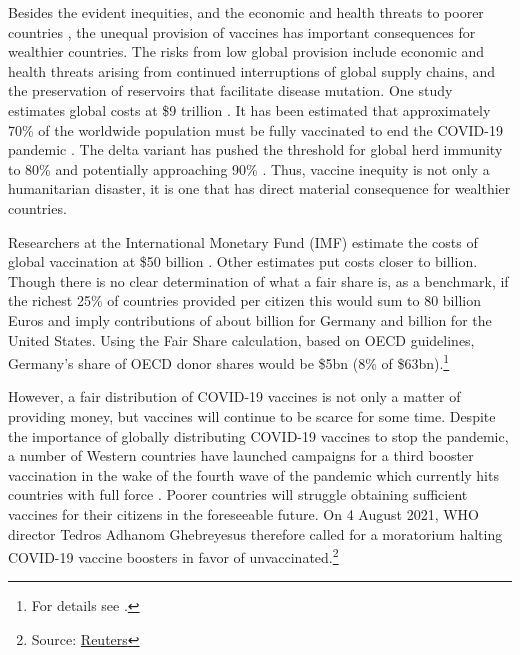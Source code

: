 \documentclass[]{article}
\begin{document}
Besides the evident inequities, and the economic and health threats to poorer countries \citep{egger2021falling}, the unequal provision of vaccines has important consequences for wealthier countries. The risks from low global provision include economic and health threats  arising from continued interruptions of global supply chains, and the preservation of reservoirs that facilitate disease mutation. One study estimates global costs at \$9 trillion \citet{agarwal2021proposal}. It has been estimated that  approximately 70\% of the worldwide population must be fully vaccinated to end the COVID-19 pandemic \citep{Randolph2020}. The delta variant has pushed the threshold for global herd immunity to  80\% and potentially approaching 90\% \citep{barker2021rethinking}.  Thus, vaccine inequity is not only a humanitarian disaster, it is one that has direct material consequence for wealthier countries. 

Researchers at the International Monetary Fund (IMF) estimate the costs of global vaccination at \$50 billion \citep{agarwal2021proposal}. Other estimates put costs closer to  billion.  Though there is no clear determination of what a fair share is, as a benchmark, if the richest 25\% of countries provided  per citizen this would sum to 80 billion Euros and imply contributions of about  billion for Germany and  billion for the United States. Using the Fair Share calculation, based on OECD guidelines, Germany's share of OECD donor shares would be \$5bn (8\% of \$63bn).\footnote{For details see \citet{care2021}.}  

However, a fair distribution of COVID-19 vaccines is not only a matter of providing money, but vaccines will continue to be scarce for some time. Despite the importance of globally distributing COVID-19 vaccines to stop the pandemic, a number of Western countries have launched campaigns for a third booster vaccination in the wake of the fourth wave of the pandemic which currently hits countries with full force \citep{Mahase2021}. Poorer countries will struggle obtaining  sufficient vaccines for their citizens in the foreseeable future. On 4 August 2021, WHO director Tedros Adhanom Ghebreyesus therefore called for a moratorium halting COVID-19 vaccine boosters in favor of unvaccinated.\footnote{Source: \href{https://www.reuters.com/business/healthcare-pharmaceuticals/who-calls-moratorium-covid-19-vaccine-booster-doses-until-september-end-2021-08-04/}{Reuters}} 
\end{document}
